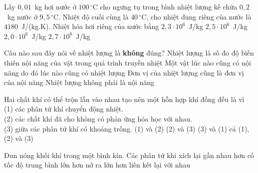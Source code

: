 	\begin{ex}%
		Lấy $0{,}01$~kg hơi nước ở $100\,^\circ\text{C}$ cho ngưng tụ trong bình nhiệt lượng kế chứa $0{,}2$~kg nước ở $9{,}5\,^\circ\text{C}$. Nhiệt độ cuối cùng là $40\,^\circ\text{C}$, cho nhiệt dung riêng của nước là $4180$~J/(kg.K). Nhiệt hóa hơi riêng của nước bằng
		\choice
		{\True $2{,}3\cdot 10^6$~J/kg}
		{$2{,}5\cdot 10^6$~J/kg}
		{$2{,}0\cdot 10^6$~J/kg}
		{$2{,}7\cdot 10^6$~J/kg}
	\end{ex}

	\begin{ex}%
		Câu nào sau đây nói về nhiệt lượng là \textbf{không} đúng?
		\choice
		{Nhiệt lượng là số đo độ biến thiên nội năng của vật trong quá trình truyền nhiệt}
		{\True Một vật lúc nào cũng có nội năng do đó lúc nào cũng có nhiệt lượng}
		{Đơn vị của nhiệt lượng cũng là đơn vị của nội năng}
		{Nhiệt lượng không phải là nội năng}
	\end{ex}

	\begin{ex}%
		Hai chất khí có thể trộn lẫn vào nhau tạo nên một hỗn hợp khí đồng đều là vì\\
		(1) các phân tử khí chuyển động nhiệt.\\
		(2) các chất khí đã cho không có phản ứng hóa học với nhau.\\
		(3) giữa các phân tử khí có khoảng trống.
		\choice
		{(1) và (2)}
		{(2) và (3)}
		{(3) và (1)}
		{\True cả (1), (2) và (3)}
	\end{ex}

	\begin{ex}%
		Đun nóng khối khí trong một bình kín. Các phân tử khí
		\choice
		{xích lại gần nhau hơn}
		{\True có tốc độ trung bình lớn hơn}
		{nở ra lớn hơn}
		{liên kết lại với nhau}
	\end{ex}

